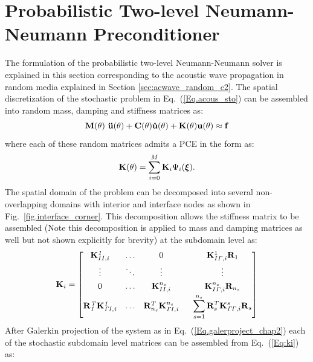 \documentclass{article}
\begin{document}
\section{Probabilistic Two-level Neumann-Neumann Preconditioner}

The formulation of the probabilistic two-level Neumann-Neumann solver is explained in this section corresponding to the acoustic wave propagation in random media explained in Section \ref{sec:acwave_random_c2}. The spatial discretization of the stochastic problem in Eq.~(\ref{Eq.acous_sto}) can be assembled into random mass, damping and stiffness matrices as:
\begin{equation}\label{Eq.randODEchapt2_2}
\bf{M} (\theta) \ \ddot{\bf{u}}(\theta) +  {\bf{C}} (\theta) \dot{\bf{u}}(\theta) + {\bf{K}} (\theta) \bf{u}(\theta) \approx \bf{f}
\end{equation}
where each of these random matrices admits a PCE in the form as:
\begin{equation}
{\bf{K}} (\theta)  = \sum_{i=0} ^{M} \mathbf{{K}}_{i}  \Psi_{i}(\bm{\xi}).
\end{equation}
The spatial domain of the problem can be decomposed into several non-overlapping domains with interior and interface nodes as shown in Fig.~\ref{fig.interface_corner}. This decomposition allows the stiffness matrix to be assembled (Note this decomposition is applied to mass and damping matrices as well but not shown explicitly for brevity) at the subdomain level as:
\begin{equation}\label{Eq:ki}
\mathrm{\mathbf{{K}}}_{i} =
{\begin{bmatrix}
     {\mathbf{K}}_{II,i}^{\it{1}} & \dots  &   0    \ \  &  {\mathbf{K}}_{I {\it{\Gamma}},i}^1 \mathbf{R}_1
\\[0.3em]
     \vdots   & \ddots & \vdots \ \  &  \vdots
\\[0.3em]
     0        & \dots  &  {\mathbf{K}}_{II,i}^{n_s}  \ \ &  {\mathbf{K}}_{I {\it{\Gamma}},i}^{n_s}  \mathbf{R}_{n_s}
\\[0.3em]
    \mathbf{R}^{\it{T}}_{\it{1}} {\mathbf{K}}_{\it{\Gamma} I,i}^{\it{1}} & \dots  &  \mathbf{R}^T_{n_s} {\mathbf{K}}_{\it{\Gamma} I,i}^{n_s}  \ \ & \displaystyle\sum_{s=1}^{n_s} \mathbf{R}^T_s {\mathbf{K}}_{{\it{\Gamma}} {\it{\Gamma}},i}^s \mathbf{R}_s
\end{bmatrix}}
\end{equation}
After Galerkin projection of the system as in Eq.~(\ref{Eq.galerproject_chap2}) each of the stochastic subdomain level matrices can be assembled from Eq.~(\ref{Eq:ki}) as:
\end{document}
